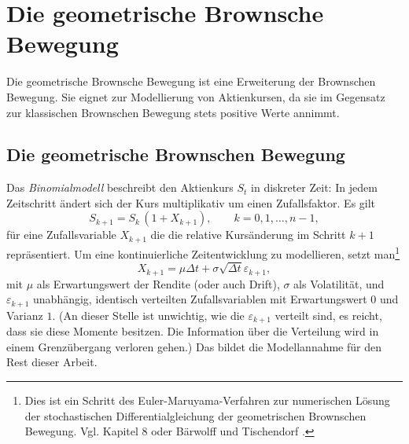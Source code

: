 \section{Die geometrische Brownsche Bewegung}

Die geometrische Brownsche Bewegung ist eine Erweiterung der Brownschen Bewegung. 
Sie eignet zur Modellierung von Aktienkursen, da sie im Gegensatz zur klassischen 
Brownschen Bewegung stets positive Werte annimmt.


\subsection{Die geometrische Brownschen Bewegung}

Das \textit{Binomialmodell} beschreibt den Aktienkurs $S_t$ in diskreter Zeit: In jedem Zeitschritt ändert sich der Kurs multiplikativ um einen Zufallsfaktor. Es gilt
$$
S_{k+1} = S_k \,(1 + X_{k+1}), \qquad k = 0,1,\dots,n-1,
$$
für eine Zufallsvariable $X_{k+1}$ die die relative Kursänderung im Schritt $k+1$ repräsentiert. Um eine kontinuierliche Zeitentwicklung zu modellieren, 
setzt man\footnote{Dies ist ein Schritt des Euler-Maruyama-Verfahren zur numerischen Lösung der 
stochastischen Differentialgleichung der geometrischen Brownschen Bewegung. Vgl. Kapitel 8 oder Bärwolff und Tischendorf \cite{Baerwolff2025}.}
$$
X_{k+1} = \mu  \Delta t + \sigma \sqrt{\Delta t}\varepsilon_{k+1},
$$
mit $\mu$ als Erwartungswert der Rendite (oder auch Drift), $\sigma$ als Volatilität, und $\varepsilon_{k+1}$ unabhängig, identisch verteilten Zufallsvariablen mit Erwartungswert $0$ und Varianz $1$. 
(An dieser Stelle ist unwichtig, wie die $\varepsilon_{k+1}$ verteilt sind, es reicht, dass sie diese Momente besitzen. 
Die Information über die Verteilung wird in einem Grenzübergang verloren gehen.)
Das bildet die Modellannahme für den Rest dieser Arbeit.

